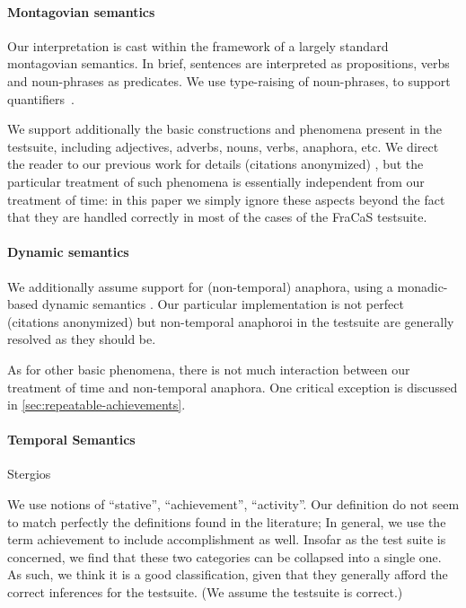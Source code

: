 \documentclass[a4paper,11pt]{article}
\begin{document}
\paragraph{Montagovian semantics}

Our interpretation is cast within the framework of a largely standard
montagovian semantics. In brief, sentences are interpreted as
propositions, verbs and noun-phrases as predicates.  We use
type-raising of noun-phrases, to support quantifiers~\citep{montague_proper_1974}.

We support additionally the basic constructions and phenomena present
in the testsuite, including adjectives, adverbs, nouns, verbs,
anaphora, etc. We direct the reader to our previous work for details
\ifanon (citations anonymized) \else
\citet{bernardy_type_2017} \fi, but the particular
treatment of such phenomena is essentially independent from our
treatment of time:
in this paper we simply ignore these aspects beyond the fact that they
are handled correctly in most of the cases of the FraCaS testsuite.

\paragraph{Dynamic semantics}
We additionally assume support for (non-temporal) anaphora, using a
monadic-based dynamic semantics \cite{unger_dynamic_2011,charlow_monadic_2015,charlow_monadic_2017}.  Our particular
implementation is not perfect \ifanon (citations anonymized) \else
\citet{bernardy_wide_2019} \fi but non-temporal anaphoroi in the
testsuite are generally resolved as they should be.

As for other basic phenomena, there is not much interaction between
our treatment of time and non-temporal anaphora. One critical
exception is discussed in \cref{sec:repeatable-achievements}.


\paragraph{Temporal Semantics}
Stergios

We use notions of ``stative'', ``achievement'', ``activity''. Our
definition do not seem to match perfectly the definitions found in the
literature; In general, we use the term achievement to include accomplishment as well. Insofar as the test suite is concerned, we find that these two categories can be collapsed into a single one.  As such,  we think it is  a good classification, given that
they generally afford the correct inferences for the testsuite. (We
assume the testsuite is correct.)
\end{document}
